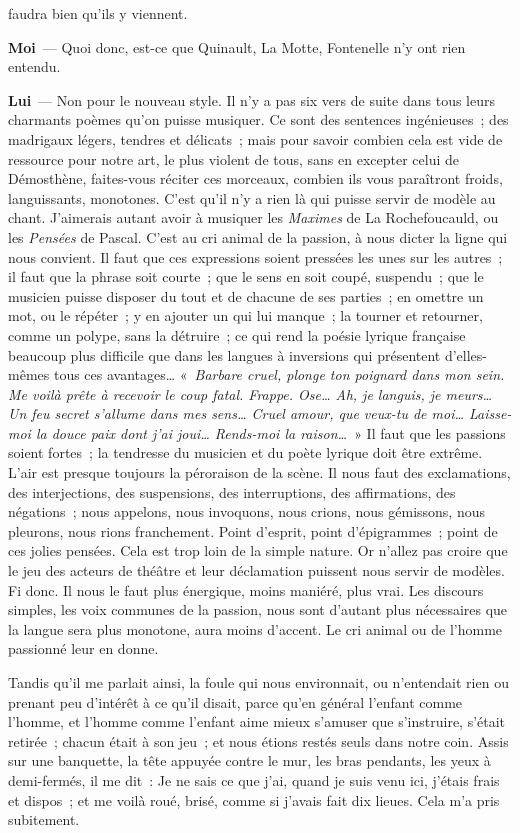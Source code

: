 \documentclass[french,twoside]{book} %
\newcommand{\labelchar}[1]{\textbf{\color{rubric} #1}}
\begin{document}
faudra bien qu’ils y viennent.\par
\labelchar{Moi} — Quoi donc, est-ce que Quinault, La Motte, Fontenelle n’y ont rien entendu.\par
\labelchar{Lui} — Non pour le nouveau style. Il n’y a pas six vers de suite dans tous leurs charmants poèmes qu’on puisse musiquer. Ce sont des sentences ingénieuses ; des madrigaux légers, tendres et délicats ; mais pour savoir combien cela est vide de ressource pour notre art, le plus violent de tous, sans en excepter celui de Démosthène, faites-vous réciter ces morceaux, combien ils vous paraîtront froids, languissants, monotones. C’est qu’il n’y a rien là qui puisse servir de modèle au chant. J’aimerais autant avoir à musiquer les \emph{Maximes} de La Rochefoucauld, ou les \emph{Pensées} de Pascal. C’est au cri animal de la passion, à nous dicter la ligne qui nous convient. Il faut que ces expressions soient pressées les unes sur les autres ; il faut que la phrase soit courte ; que le sens en soit coupé, suspendu ; que le musicien puisse disposer du tout et de chacune de ses parties ; en omettre un mot, ou le répéter ; y en ajouter un qui lui manque ; la tourner et retourner, comme un polype, sans la détruire ; ce qui rend la poésie lyrique française beaucoup plus difficile que dans les langues à inversions qui présentent d’elles-mêmes tous ces avantages… « \emph{Barbare cruel, plonge ton poignard dans mon sein. Me voilà prête à recevoir le coup fatal. Frappe. Ose… Ah, je languis, je meurs… Un feu secret s’allume dans mes sens… Cruel amour, que veux-tu de moi… Laisse-moi la douce paix dont j’ai joui… Rends-moi la raison…} » Il faut que les passions soient fortes ; la tendresse du musicien et du poète lyrique doit être extrême. L’air est presque toujours la péroraison de la scène. Il nous faut des exclamations, des interjections, des suspensions, des interruptions, des affirmations, des négations ; nous appelons, nous invoquons, nous crions, nous gémissons, nous pleurons, nous rions franchement. Point d’esprit, point d’épigrammes ; point de ces jolies pensées. Cela est trop loin de la simple nature. Or n’allez pas croire que le jeu des acteurs de théâtre et leur déclamation puissent nous servir de modèles. Fi donc. Il nous le faut plus énergique, moins maniéré, plus vrai. Les discours simples, les voix communes de la passion, nous sont d’autant plus nécessaires que la langue sera plus monotone, aura moins d’accent. Le cri animal ou de l’homme passionné leur en donne.\par
Tandis qu’il me parlait ainsi, la foule qui nous environnait, ou n’entendait rien ou prenant peu d’intérêt à ce qu’il disait, parce qu’en général l’enfant comme l’homme, et l’homme comme l’enfant aime mieux s’amuser que s’instruire, s’était retirée ; chacun était à son jeu ; et nous étions restés seuls dans notre coin. Assis sur une banquette, la tête appuyée contre le mur, les bras pendants, les yeux à demi-fermés, il me dit : Je ne sais ce que j’ai, quand je suis venu ici, j’étais frais et dispos ; et me voilà roué, brisé, comme si j’avais fait dix lieues. Cela m’a pris subitement.\par
\end{document}
